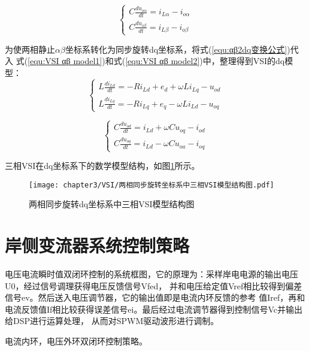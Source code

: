 \begin{equation}
	\begin{cases}
		C\frac{du_{o\alpha}}{dt}=i_{L\alpha}-i_{o\alpha} \\
		C\frac{du_{o\beta}}{dt}=i_{L\beta}-i_{o\beta}
	\end{cases}
	\label{equ:VSI αβ model2}
\end{equation}

为使两相静止$\alpha\beta$坐标系转化为同步旋转dq坐标系，将式(\ref{equ:αβ2dq变换公式})代入
式(\ref{equ:VSI αβ model1})和式(\ref{equ:VSI αβ model2})中，整理得到VSI的dq模型：
\begin{equation}
	\begin{cases}
		L\frac{di_{Ld}}{dt}=-Ri_{Ld}+e_{d}+\omega Li_{Lq}-u_{od} \\
		L\frac{di_{Lq}}{dt}=-Ri_{Lq}+e_{q}-\omega Li_{Ld}-u_{oq}
	\end{cases}
	\label{equ:VSI dq model1}
\end{equation}

\begin{equation}
	\begin{cases}
		C\frac{du_{od}}{dt}=i_{Ld}+\omega Cu_{oq}-i_{od} \\
		C\frac{du_{oq}}{dt}=i_{Ld}-\omega Cu_{oa}-i_{oq}
	\end{cases}
	\label{equ:VSI dq model2}
\end{equation}

三相VSI在dq坐标系下的数学模型结构，如图\ref{fig:两相同步旋转dq坐标系中三相VSI模型结构图}所示。

\begin{figure}[!htp]
	\centering
	\texttt{[image: chapter3/VSI/两相同步旋转坐标系中三相VSI模型结构图.pdf]}
	\caption{两相同步旋转dq坐标系中三相VSI模型结构图}
	\label{fig:两相同步旋转dq坐标系中三相VSI模型结构图}
\end{figure}

\section{岸侧变流器系统控制策略}

电压电流瞬时值双闭环控制的系统框图，它的原理为：采样岸电电源的输出电压U0，经过信号调理获得电压反馈信号Vfed，
并和电压给定值Vref相比较得到偏差信号ev。然后送入电压调节器，它的输出值即是电流内环反馈的参考
值Iref，再和电流反馈值If相比较获得误差信号ei。最后经过电流调节器得到控制信号Vc并输出给DSP进行运算处理，
从而对SPWM驱动波形进行调制。

电流内环，电压外环双闭环控制策略。

